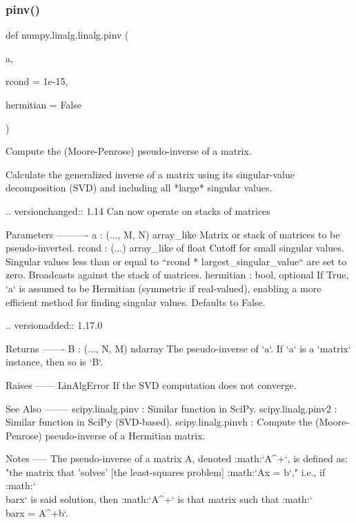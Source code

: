 \subsubsection{\texorpdfstring{pinv()}{pinv()}}
{\footnotesize\ttfamily def numpy.\+linalg.\+linalg.\+pinv (\begin{DoxyParamCaption}\item[{}]{a,  }\item[{}]{rcond = {\ttfamily 1e-\/15},  }\item[{}]{hermitian = {\ttfamily False} }\end{DoxyParamCaption})}

\begin{DoxyVerb}Compute the (Moore-Penrose) pseudo-inverse of a matrix.

Calculate the generalized inverse of a matrix using its
singular-value decomposition (SVD) and including all
*large* singular values.

.. versionchanged:: 1.14
   Can now operate on stacks of matrices

Parameters
----------
a : (..., M, N) array_like
    Matrix or stack of matrices to be pseudo-inverted.
rcond : (...) array_like of float
    Cutoff for small singular values.
    Singular values less than or equal to
    ``rcond * largest_singular_value`` are set to zero.
    Broadcasts against the stack of matrices.
hermitian : bool, optional
    If True, `a` is assumed to be Hermitian (symmetric if real-valued),
    enabling a more efficient method for finding singular values.
    Defaults to False.

    .. versionadded:: 1.17.0

Returns
-------
B : (..., N, M) ndarray
    The pseudo-inverse of `a`. If `a` is a `matrix` instance, then so
    is `B`.

Raises
------
LinAlgError
    If the SVD computation does not converge.

See Also
--------
scipy.linalg.pinv : Similar function in SciPy.
scipy.linalg.pinv2 : Similar function in SciPy (SVD-based).
scipy.linalg.pinvh : Compute the (Moore-Penrose) pseudo-inverse of a
                     Hermitian matrix.

Notes
-----
The pseudo-inverse of a matrix A, denoted :math:`A^+`, is
defined as: "the matrix that 'solves' [the least-squares problem]
:math:`Ax = b`," i.e., if :math:`\\bar{x}` is said solution, then
:math:`A^+` is that matrix such that :math:`\\bar{x} = A^+b`.


\end{DoxyVerb}
